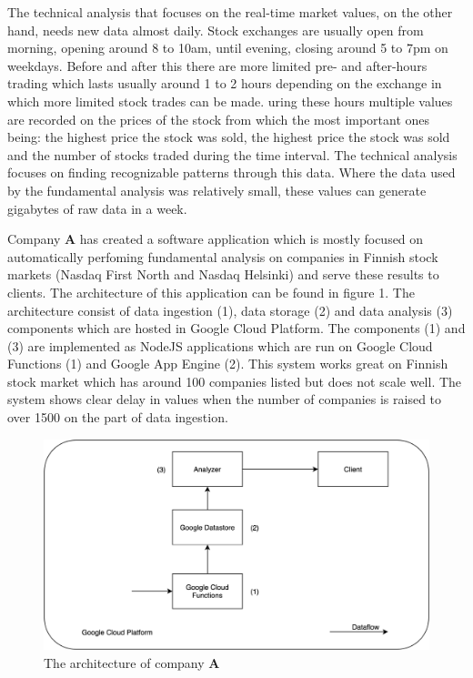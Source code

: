 \documentclass[article,11pt]{article}
\begin{document}
The technical analysis that focuses on the real-time market values, on the other hand, needs new data almost daily.
Stock exchanges are usually open from morning, opening around 8 to 10am, until evening, closing around 5 to 7pm on weekdays.
Before and after this there are more limited pre- and after-hours trading which lasts usually around 1 to 2 hours depending on the exchange in which more limited stock trades can be made.
uring these hours multiple values are recorded on the prices of the stock from which the most important ones being: the highest price the stock was sold, the highest price the stock was sold and the number of stocks traded during the time interval.
The technical analysis focuses on finding recognizable patterns through this data. \cite{murphy}
Where the data used by the fundamental analysis was relatively small, these values can generate gigabytes of raw data in a week.

Company \textbf{A} has created a software application which is mostly focused on automatically perfoming fundamental analysis on companies in Finnish stock markets (Nasdaq First North and Nasdaq Helsinki) and serve these results to clients.
The architecture of this application can be found in figure 1.
The architecture consist of data ingestion (1), data storage (2) and data analysis (3) components which are hosted in Google Cloud Platform.
The components (1) and (3) are implemented as NodeJS applications which are run on Google Cloud Functions (1) and Google App Engine (2).
This system works great on Finnish stock market which has around 100 companies listed but does not scale well.
The system shows clear delay in values when the number of companies is raised to over 1500 on the part of data ingestion. 

\begin{figure}[h]
    \includegraphics[scale=0.3]{system} 
    \centering
    \caption{The architecture of company \textbf{A}}
\end{figure}
\end{document}
